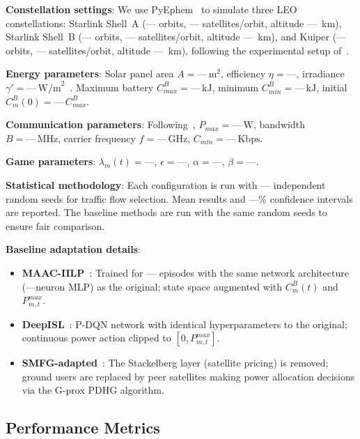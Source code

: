 \documentclass[journal]{IEEEtran}
\newcommand{\CB}{C^{B}}
\newcommand{\CBmin}{C^{B}_{min}}
\newcommand{\CBmax}{C^{B}_{max}}
\newcommand{\Pmax}{P_{max}}
\begin{document}
\textbf{Constellation settings}: We use
PyEphem~\cite{cen2024satflow} to simulate three LEO constellations: Starlink Shell~A (--- orbits, --- satellites/orbit, altitude ---~km), Starlink Shell~B (--- orbits, --- satellites/orbit, altitude ---~km), and Kuiper (--- orbits, --- satellites/orbit, altitude ---~km), following the experimental setup of~\cite{cen2024satflow}.

\textbf{Energy parameters}: Solar panel area
$A=\text{---}\,\mathrm{m}^2$, efficiency $\eta=\text{---}$, irradiance $\gamma'=\text{---}\,\mathrm{W/m}^2$~\cite{li2023energy}. Maximum battery $\CBmax=\text{---}\,\mathrm{kJ}$, minimum $\CBmin=\text{---}\,\mathrm{kJ}$, initial $\CB_m(0)=\text{---}\,\CBmax$.

\textbf{Communication parameters}:
Following~\cite{cen2024satflow}, $\Pmax=\text{---}\,\mathrm{W}$, bandwidth $B=\text{---}\,\mathrm{MHz}$, carrier frequency $f=\text{---}\,\mathrm{GHz}$, $C_{min}=\text{---}\,\mathrm{Kbps}$.

\textbf{Game parameters}: $\lambda_m(t)=\text{---}$,
$\epsilon=\text{---}$, $\alpha=\text{---}$, $\beta=\text{---}$.

\textbf{Statistical methodology}: Each configuration
is run with --- independent random seeds for traffic flow selection. Mean results and ---\% confidence intervals are reported. The baseline methods are run with the same random seeds to ensure fair comparison.

\textbf{Baseline adaptation details}:
\begin{itemize}
    \item \textbf{MAAC-IILP}~\cite{li2023energy}:
Trained for --- episodes with the same network architecture (---neuron MLP) as the original; state space augmented with $\CB_m(t)$ and $P_{m,t}^{max}$.
    \item \textbf{DeepISL}~\cite{li2023deepisl}:
P-DQN network with identical hyperparameters to the original; continuous power action clipped to $[0, P_{m,t}^{max}]$.
    \item \textbf{SMFG-adapted}~\cite{wang2023smfg}:
The Stackelberg layer (satellite pricing) is removed; ground users are replaced by peer satellites making power allocation decisions via the G-prox PDHG algorithm.
\end{itemize}

\subsection{Performance Metrics}
\end{document}
